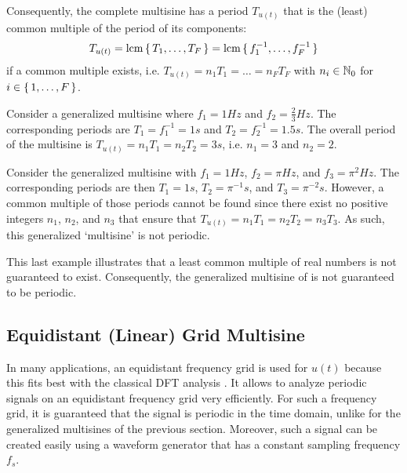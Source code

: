   Consequently, the complete multisine has a period $T_{u(t)}$ that is the (least) common multiple of the period of its components:
  \begin{equation}
    T_{u(t)}  = \operatorname{lcm} \set{T_1, \ldots, T_F}
      = \operatorname{lcm} \set{f_1^{-1}, \ldots, f_F^{-1}}
  \end{equation}
  if a common multiple exists, i.e. $T_{u(t)} = n_1 T_1 = \ldots = n_F T_F$ with $n_i \in \mathbb{N}_{0}$ for $i \in \set{1,\ldots,F}$.

  \begin{example}
   Consider a generalized multisine where $f_1 = 1 \unit{Hz}$ and $f_2 = \tfrac{2}{3} \unit{Hz}$.
   The corresponding periods are $T_1 = f_1^{-1} = 1 \unit{s}$ and $T_2 = f_2^{-1} = 1.5 \unit{s}$.
   The overall period of the multisine is $T_{u(t)} = n_1 T_1 = n_2 T_2 = 3 \unit{s}$, i.e. $n_1 = 3$ and $n_2=2$.
  \end{example}

  \begin{example}\label{eg:excitation:non-periodic}
   Consider the generalized multisine with $f_1 = 1 \unit{Hz}$, $f_2 = \pi \unit{Hz}$, and $f_3 = \pi^2 \unit{Hz}$.
   The corresponding periods are then $T_1 = 1 \unit{s}$, $T_2 = \pi^{-1} \unit{s}$, and $T_3 = \pi^{-2} \unit{s}$.
   However, a common multiple of those periods cannot be found since there exist no positive integers $n_1$, $n_2$, and $n_3$ that ensure that $T_{u(t)} = n_1 T_1 = n_2 T_2 = n_3 T_3$.
   As such, this generalized `multisine' is not periodic.
  \end{example}

  This last example illustrates that a least common multiple of real numbers is not guaranteed to exist.
  Consequently, the generalized multisine of  is not guaranteed to be periodic.
  
\subsection{Equidistant (Linear) Grid Multisine}
  In many applications, an equidistant frequency grid is used for $u\left( t\right) $ because this fits best with the classical \gls{DFT} analysis \citep{OppenheimDT,Mandal2007}.
  It allows to analyze periodic signals on an equidistant frequency grid very efficiently.
  For such a frequency grid, it is guaranteed that the signal is periodic in the time domain, unlike for the generalized multisines of the previous section.
  Moreover, such a signal can be created easily using a waveform generator that has a constant sampling frequency $f_s$.
  
